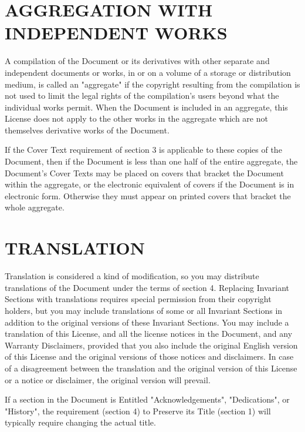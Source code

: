 \documentclass{stacks-project-book}
\theoremstyle{plain}
\theoremstyle{definition}
\theoremstyle{remark}
\numberwithin{equation}{subsection}
\begin{document}
\section{AGGREGATION WITH INDEPENDENT WORKS}
\label{fdl-section-aggregation-with-independent-works}


A compilation of the Document or its derivatives with other separate
and independent documents or works, in or on a volume of a storage or
distribution medium, is called an "aggregate" if the copyright
resulting from the compilation is not used to limit the legal rights
of the compilation's users beyond what the individual works permit.
When the Document is included in an aggregate, this License does not
apply to the other works in the aggregate which are not themselves
derivative works of the Document.

If the Cover Text requirement of section 3 is applicable to these
copies of the Document, then if the Document is less than one half of
the entire aggregate, the Document's Cover Texts may be placed on
covers that bracket the Document within the aggregate, or the
electronic equivalent of covers if the Document is in electronic form.
Otherwise they must appear on printed covers that bracket the whole
aggregate.


\section{TRANSLATION}
\label{fdl-section-translation}


Translation is considered a kind of modification, so you may
distribute translations of the Document under the terms of section 4.
Replacing Invariant Sections with translations requires special
permission from their copyright holders, but you may include
translations of some or all Invariant Sections in addition to the
original versions of these Invariant Sections.  You may include a
translation of this License, and all the license notices in the
Document, and any Warranty Disclaimers, provided that you also include
the original English version of this License and the original versions
of those notices and disclaimers.  In case of a disagreement between
the translation and the original version of this License or a notice
or disclaimer, the original version will prevail.

If a section in the Document is Entitled "Acknowledgements",
"Dedications", or "History", the requirement (section 4) to Preserve
its Title (section 1) will typically require changing the actual
title.
\end{document}
